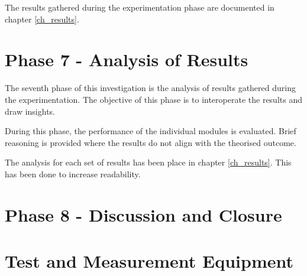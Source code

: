 The results gathered during the experimentation phase are documented in chapter \ref{ch_results}.


\section{Phase 7 - Analysis of Results}

The seventh phase of this investigation is the analysis of results gathered during the experimentation. The objective of this phase is to interoperate the results and draw insights.

During this phase, the performance of the individual modules is evaluated. Brief reasoning is provided where the results do not align with the theorised outcome.

The analysis for each set of results has been place in chapter \ref{ch_results}. This has been done to increase readability.



\section{Phase 8 - Discussion and Closure}





\section{Test and Measurement Equipment}
\label{sec:test_and_measurement_equipment}








